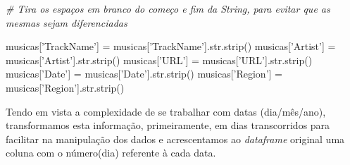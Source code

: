 \documentclass[11pt]{article}
\newenvironment{Shaded}{}{}
\newcommand{\KeywordTok}[1]{\textcolor[rgb]{0.00,0.44,0.13}{\textbf{{#1}}}}
\newcommand{\StringTok}[1]{\textcolor[rgb]{0.25,0.44,0.63}{{#1}}}
\newcommand{\CommentTok}[1]{\textcolor[rgb]{0.38,0.63,0.69}{\textit{{#1}}}}
\newcommand{\NormalTok}[1]{{#1}}
\newcommand{\ControlFlowTok}[1]{\textcolor[rgb]{0.00,0.44,0.13}{\textbf{{#1}}}}
\newcommand{\OperatorTok}[1]{\textcolor[rgb]{0.40,0.40,0.40}{{#1}}}
\newcommand{\BuiltInTok}[1]{{#1}}
\begin{document}
    \begin{Shaded}
\end{Shaded}

    \begin{Shaded}
\begin{Highlighting}[]
    \CommentTok{# Tira os espaços em branco do começo e fim da String, para evitar que as mesmas sejam diferenciadas}

\NormalTok{musicas[}\StringTok{'TrackName'}\NormalTok{] }\OperatorTok{=}\NormalTok{ musicas[}\StringTok{'TrackName'}\NormalTok{].}\BuiltInTok{str}\NormalTok{.strip()}
\NormalTok{musicas[}\StringTok{'Artist'}\NormalTok{] }\OperatorTok{=}\NormalTok{ musicas[}\StringTok{'Artist'}\NormalTok{].}\BuiltInTok{str}\NormalTok{.strip()}
\NormalTok{musicas[}\StringTok{'URL'}\NormalTok{] }\OperatorTok{=}\NormalTok{ musicas[}\StringTok{'URL'}\NormalTok{].}\BuiltInTok{str}\NormalTok{.strip()}
\NormalTok{musicas[}\StringTok{'Date'}\NormalTok{] }\OperatorTok{=}\NormalTok{ musicas[}\StringTok{'Date'}\NormalTok{].}\BuiltInTok{str}\NormalTok{.strip()}
\NormalTok{musicas[}\StringTok{'Region'}\NormalTok{] }\OperatorTok{=}\NormalTok{ musicas[}\StringTok{'Region'}\NormalTok{].}\BuiltInTok{str}\NormalTok{.strip()}
\end{Highlighting}
\end{Shaded}

    Tendo em vista a complexidade de se trabalhar com datas (dia/mês/ano),
transformamos esta informação, primeiramente, em dias transcorridos para
facilitar na manipulação dos dados e acrescentamos ao \emph{dataframe}
original uma coluna com o número(dia) referente à cada data.
\end{document}
